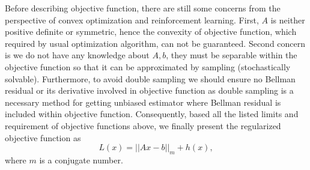 \documentclass[conference]{IEEEtran}
\begin{document}
Before describing objective function, there are still some concerns from the perspective of convex optimization and reinforcement learning. First, $A$ is neither positive definite or symmetric, hence the convexity of objective function, which required by usual optimization algorithm, can not be guaranteed. Second concern is we do not have any knowledge about $A, b$, they must be separable within the objective function so that it can be approximated by sampling (stochastically solvable). Furthermore, to avoid double sampling we should ensure no Bellman residual or its derivative involved in objective function as double sampling is a necessary method for getting unbiased estimator where Bellman residual is included within objective function. Consequently, based all the listed limits and requirement of objective functions above, we finally present the regularized objective function as
\begin{equation}
	L(x)=||Ax-b||_m+h(x),
\end{equation}
where $m$ is a conjugate number.
\end{document}
